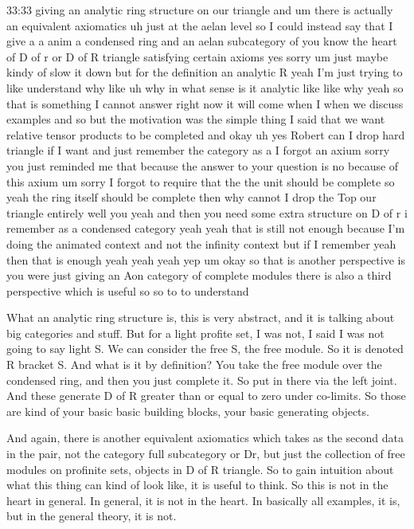 \begin{unfinished}{33:33}
giving an analytic ring structure on our triangle and um there is actually an equivalent axiomatics uh just at the aelan level so I could instead say that I give a a anim a condensed ring and an aelan subcategory of you know the heart of D of r or D of R triangle satisfying certain axioms yes sorry um just maybe kindy of slow it down but for the definition an analytic R yeah I'm just trying to like understand why like uh why in what sense is it analytic like like why yeah so that is something I cannot answer right now it will come when I when we discuss examples and so but the motivation was the simple thing I said that we want relative tensor products to be completed and okay uh yes Robert can I drop hard triangle if I want and just remember the category as a I forgot an axium sorry you just reminded me that because the answer to your question is no because of this axium um sorry I forgot to require that the the unit should be complete so yeah the ring itself should be complete then why cannot I drop the Top our triangle entirely well you yeah and then you need some extra structure on D of r i remember as a condensed category yeah yeah that is still not enough because I'm doing the animated context and not the infinity context but if I remember yeah then that is enough yeah yeah yeah yep um okay so that is another perspective is you were just giving an Aon category of complete modules there is also a third perspective which is useful so so to to understand

What an analytic ring structure is, this is very abstract, and it is talking about big categories and stuff. But for a light profite set, I was not, I said I was not going to say light S. We can consider the free S, the free module. So it is denoted R bracket S. And what is it by definition? You take the free module over the condensed ring, and then you just complete it. So put in there via the left joint. And these generate D of R greater than or equal to zero under co-limits. So those are kind of your basic basic building blocks, your basic generating objects. 

And again, there is another equivalent axiomatics which takes as the second data in the pair, not the category full subcategory or Dr, but just the collection of free modules on profinite sets, objects in D of R triangle. So to gain intuition about what this thing can kind of look like, it is useful to think. So this is not in the heart in general. In general, it is not in the heart. In basically all examples, it is, but in the general theory, it is not. 


\end{unfinished}
